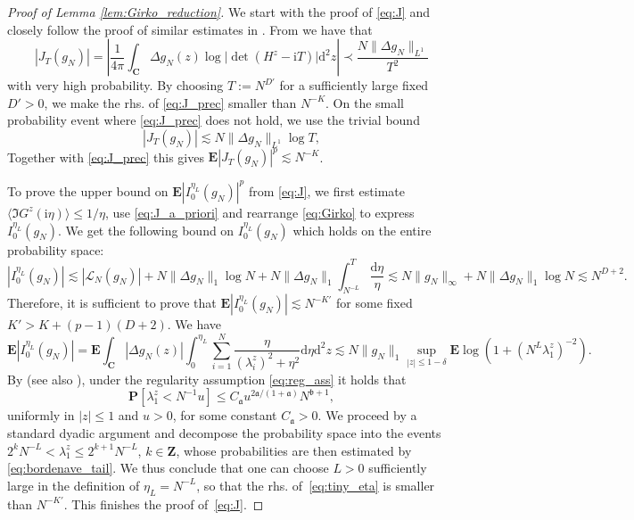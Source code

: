 \documentclass[10pt]{amsart}
\numberwithin{equation}{section}
\newcommand{\dif}{\mathrm{d}}
\newcommand{\E}{\mathbf{E}}
\newcommand{\C}{\mathbf{C}}
\newcommand{\ii}{\mathrm{i}}
\begin{document}
\begin{proof}[Proof of Lemma \ref{lem:Girko_reduction}] We start with the proof of \eqref{eq:J} and closely follow the proof of similar estimates in \cite[Lemma~3]{nonherm_edge_univ}. From \cite[Eq.(5.27)--(5.28)]{loc_circ_law18} we have that
\begin{equation}
|J_T(g_N)|=\left\vert \frac{1}{4\pi} \int_\C \Delta g_N(z)\log \vert \det (H^z-\ii T)\vert\dif^2 z\right\vert \prec \frac{N\lVert \Delta g_N\rVert_{L^1}}{T^2}
\label{eq:J_prec}
\end{equation}
with very high probability. By choosing $T:=N^{D'}$ for a sufficiently large fixed $D'>0$, we make the rhs. of \eqref{eq:J_prec} smaller than $N^{-K}$. On the small probability event where \eqref{eq:J_prec} does not hold, we use the trivial bound
\begin{equation}
|J_T(g_N)| \lesssim N\lVert \Delta g_N\rVert_{L^1}\log T,
\label{eq:J_a_priori}
\end{equation}
Together with \eqref{eq:J_prec} this gives $\E |J_T(g_N)|^p \lesssim N^{-K}$.

To prove the upper bound on $\E\left\vert I_0^{\eta_L}(g_N)\right\vert^p$ from \eqref{eq:J}, we first estimate $\langle \Im G^z(\ii\eta)\rangle\le 1/\eta$, use \eqref{eq:J_a_priori} and rearrange \eqref{eq:Girko} to express $I_0^{\eta_L}(g_N)$. We get the following bound on $I_0^{\eta_L}(g_N)$ which holds on the entire probability space:
\begin{equation*}
|I_0^{\eta_L}(g_N)|\! \lesssim\! \left\vert \mathcal{L}_N(g_N)\right\vert + N\|\Delta g_N\|_1\log N + N\|\Delta g_N\|_1\!\!\int_{N^{-L}}^T \frac{\dif\eta}{\eta}\!\lesssim\! N\|g_N\|_\infty + N\|\Delta g_N\|_1\log N\lesssim N^{D+2}.
\end{equation*}
Therefore, it is sufficient to prove that $\E \left\vert I_0^{\eta_L}(g_N)\right\vert \lesssim N^{-K'}$ for some fixed  $K'>K+(p-1)(D+2)$. We have
\begin{equation}
\E \left\vert I_0^{\eta_L}(g_N)\right\vert = \E\int_\C |\Delta g_N(z)|\int_0^{\eta_L}\sum_{i=1}^N \frac{\eta}{(\lambda_i^z)^2+\eta^2}\dif\eta\dif^2 z\lesssim N\|g_N\|_1\sup_{|z|\le 1-\delta} \E\log \left(1+(N^{L}\lambda^z_1)^{-2}\right).
\label{eq:tiny_eta}
\end{equation}
By \cite[Lemma~4.12]{bordenave2012around} (see also \cite[Proposition~5.7]{loc_circ_law18}), under the regularity assumption \eqref{eq:reg_ass} it holds that 
\begin{equation}
\mathbf{P}[\lambda_1^z<N^{-1}u] \le C_{\mathfrak{a}} u^{2\mathfrak{a}/(1+\mathfrak{a})}N^{\mathfrak{b}+1},
\label{eq:bordenave_tail}
\end{equation}
uniformly in $|z|\le 1$ and $u>0$, for some constant $C_{\mathfrak{a}}>0$. We proceed by a standard dyadic argument and decompose the probability space into the events $2^kN^{-L}<\lambda_1^z\le 2^{k+1}N^{-L}$, $k\in\mathbf{Z}$, whose probabilities are then estimated by \eqref{eq:bordenave_tail}.  We thus conclude that one can choose $L>0$ sufficiently large in the definition of $\eta_L=N^{-L}$, so that the rhs. of~\eqref{eq:tiny_eta} is smaller than $N^{-K'}$. This finishes the proof of~\eqref{eq:J}. 


\end{proof}
\end{document}
